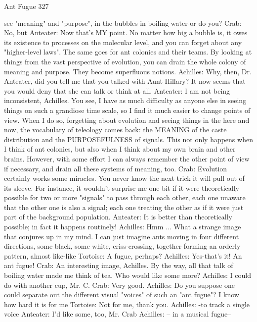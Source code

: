 Ant Fugue                                                                               327

    see "meaning" and "purpose", in the bubbles in boiling water-or do you?
Crab: No, but
Anteater: Now that's MY point. No matter how big a bubble is, it owes its existence to
    processes on the molecular level, and you can forget about any "higher-level laws".
    The same goes for ant colonies and their teams. By looking at things from the vast
    perspective of evolution, you can drain the whole colony of meaning and purpose.
    They become superfluous notions.
Achilles: Why, then, Dr. Anteater, did you tell me that you talked with Aunt Hillary? It
    now seems that you would deny that she can talk or think at all.
Anteater: I am not being inconsistent, Achilles. You see, I have as much difficulty as
    anyone else in seeing things on such a grandiose time scale, so I find it much easier
    to change points of view. When I do so, forgetting about evolution and seeing things
    in the here and now, the vocabulary of teleology comes back: the MEANING of the
    caste distribution and the PURPOSEFULNESS of signals. This not only happens
    when I think of ant colonies, but also when I think about my own brain and other
    brains. However, with some effort I can always remember the other point of view if
    necessary, and drain all these systems of meaning, too.
Crab: Evolution certainly works some miracles. You never know the next trick it will pull
    out of its sleeve. For instance, it wouldn't surprise me one bit if it were theoretically
    possible for two or more "signals" to pass through each other, each one unaware that
    the other one is also a signal; each one treating the other as if it were just part of the
    background population.
Anteater: It is better than theoretically possible; in fact it happens routinely!
Achilles: Hmm ... What a strange image that conjures up in my mind. I can just imagine
    ants moving in four different directions, some black, some white, criss-crossing,
    together forming an orderly pattern, almost like-like
Tortoise: A fugue, perhaps?
Achilles: Yes-that's it! An ant fugue!
Crab: An interesting image, Achilles. By the way, all that talk of boiling water made me
    think of tea. Who would like some more? Achilles: I could do with another cup, Mr.
    C.
Crab: Very good.
Achilles: Do you suppose one could separate out the different visual "voices" of such an
    "ant fugue"? I know how hard it is for me
Tortoise: Not for me, thank you.
Achilles: -to track a single voice
Anteater: I'd like some, too, Mr. Crab
Achilles: -- in a musical fugue--




